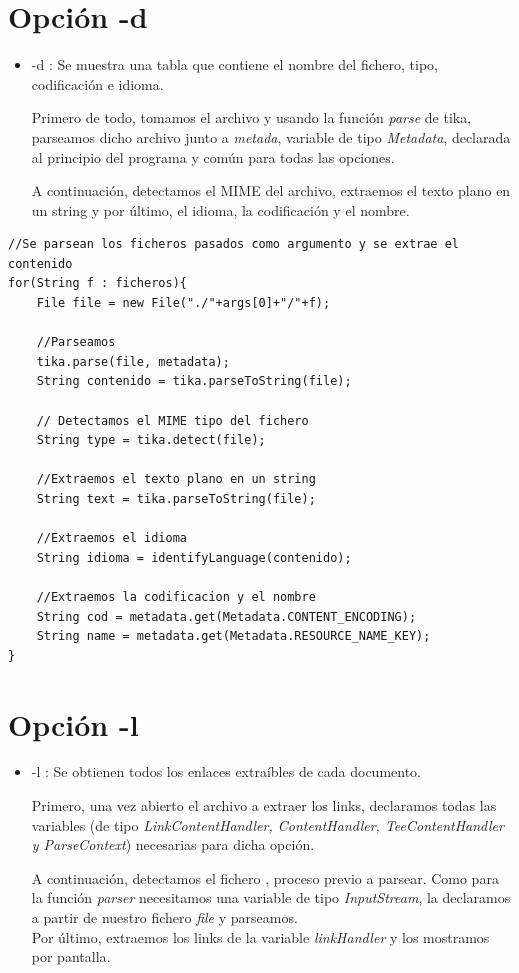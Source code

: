 \section{Opción -d}
\begin{itemize}
		\item -d : Se muestra una tabla que contiene el nombre del fichero, tipo, codificación e idioma. 
		
		Primero de todo, tomamos el archivo y usando la función \textit{parse} de tika, parseamos dicho archivo junto a \textit{metada}, variable de tipo \textit{Metadata}, declarada al principio del programa y común para todas las opciones.
		
		A continuación, detectamos el MIME del archivo, extraemos el texto plano en un string y por último, el idioma, la codificación y el nombre.
\end{itemize}
\lstset{language=C, breaklines=true, basicstyle=\footnotesize}
\begin{lstlisting}[frame=single]
//Se parsean los ficheros pasados como argumento y se extrae el contenido
for(String f : ficheros){
	File file = new File("./"+args[0]+"/"+f);
						
	//Parseamos
	tika.parse(file, metadata);
	String contenido = tika.parseToString(file);            
	
	// Detectamos el MIME tipo del fichero
	String type = tika.detect(file);
	
	//Extraemos el texto plano en un string
	String text = tika.parseToString(file);
	
	//Extraemos el idioma
	String idioma = identifyLanguage(contenido);
	
	//Extraemos la codificacion y el nombre
	String cod = metadata.get(Metadata.CONTENT_ENCODING);
	String name = metadata.get(Metadata.RESOURCE_NAME_KEY);
}
\end{lstlisting}

\newpage
\section{Opción -l}
\begin{itemize}
	\item -l : Se obtienen todos los enlaces extraíbles de cada documento. 
	
	Primero, una vez abierto el archivo a extraer los links, declaramos todas las variables (de tipo \textit{LinkContentHandler, ContentHandler, TeeContentHandler y ParseContext}) necesarias para dicha opción. 
	
	A continuación, detectamos el fichero , proceso previo a parsear.
	Como para la función \textit{parser} necesitamos una variable de tipo \textit{InputStream}, la declaramos a partir de nuestro fichero \textit{file} y parseamos. \\
	Por último, extraemos los links de la variable \textit{linkHandler} y los mostramos por pantalla.
\end{itemize}
	
